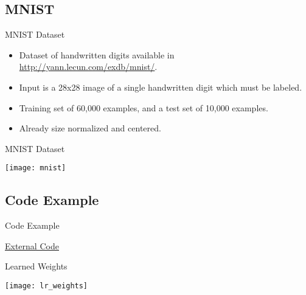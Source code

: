 \subsection{MNIST}
\begin{frame}{MNIST Dataset}
\begin{itemize}
	\item Dataset of handwritten digits available in \url{http://yann.lecun.com/exdb/mnist/}.
	\item Input is a 28x28 image of a single handwritten digit which must be labeled.
	\item Training set of 60,000 examples, and a test set of 10,000 examples.
	\item Already size normalized and centered.
\end{itemize}
\end{frame}

\begin{frame}{MNIST Dataset}
	\begin{center}
		\texttt{[image: mnist]}
	\end{center}
\end{frame}

\subsection{Code Example}
\begin{frame}{Code Example}
	\begin{center}
		\textcolor{blue!75}{\underline{ \href{https://github.com/davifrossard/iml/blob/master/04_LogRegAndNN/Sample_Code/Logistic Regression.py}{External Code}}}
	\end{center}
\end{frame}


\begin{frame}{Learned Weights}
	\begin{center}
		\texttt{[image: lr\_weights]}
	\end{center}
\end{frame}


